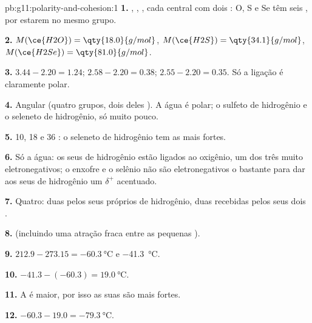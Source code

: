 \begin{solution}{pb:g11:polarity-and-cohesion:1}
\textbf{1.} , , , cada  central com
dois : O, S e Se têm seis , por
estarem no mesmo grupo.

\textbf{2.} $M(\ce{H2O}) = \qty{18.0}{g/mol}$, $M(\ce{H2S}) =
\qty{34.1}{g/mol}$, $M(\ce{H2Se}) = \qty{81.0}{g/mol}$.

\textbf{3.} $3.44 - 2.20 = 1.24$; $2.58 - 2.20 = 0.38$;
$2.55 - 2.20 = 0.35$. Só a ligação  é claramente polar.

\textbf{4.} Angular (quatro grupos, dois deles ). A
água é polar; o sulfeto de hidrogênio e o seleneto de hidrogênio, só
muito pouco.

\textbf{5.} 10, 18 e 36 : o seleneto de hidrogênio tem as
 mais fortes.

\textbf{6.} Só a água: os seus  de hidrogênio estão ligados ao
oxigênio, um dos três  muito eletronegativos; o enxofre e o
selênio não são eletronegativos o bastante para dar aos seus  de
hidrogênio um $\delta^+$ acentuado.

\textbf{7.} Quatro: duas pelos seus próprios  de hidrogênio, duas
recebidas pelos seus dois .

\textbf{8.}  (incluindo uma atração fraca
entre as pequenas ).

\textbf{9.} $212.9 - 273.15 = \qty{-60.3}{\celsius}$ e
\qty{-41.3}{\celsius}.

\textbf{10.} $-41.3 - (-60.3) = \qty{19.0}{\celsius}$.

\textbf{11.} A  é maior, por isso as suas  são mais fortes.

\textbf{12.} $-60.3 - 19.0 = \qty{-79.3}{\celsius}$.


\end{solution}
